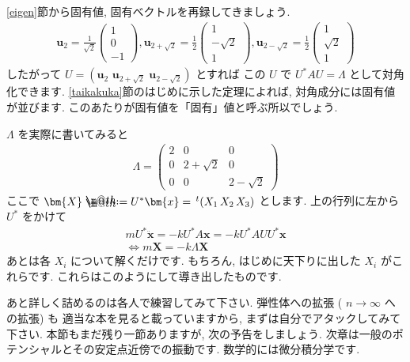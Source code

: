\documentclass[openany, a4paper, oneside]{jsbook}
\makeatletter
\newcommand*{\defeq}{\mathrel{\rlap{%
\raisebox{0.3ex}{$\m@th\cdot$}}%
\raisebox{-0.3ex}{$\m@th\cdot$}}%
=}
\theoremstyle{break}
\theoremstyle{breakdefn}
\makeatother
\begin{document}
\ref{eigen}節から固有値, 固有ベクトルを再録してきましょう.
    \begin{align}
        \bm{u}_{2}
        =
        \frac{1}{\sqrt{2}} \begin{pmatrix} 1 \\ 0 \\ -1 \end{pmatrix} ,
        \bm{u}_{2 + \sqrt{2}}
        =
        \frac{1}{2} \begin{pmatrix} 1 \\ -\sqrt{2} \\ 1 \end{pmatrix} ,
        \bm{u}_{2 - \sqrt{2}}
        =
        \frac{1}{2} \begin{pmatrix} 1 \\ \sqrt{2} \\ 1 \end{pmatrix}
    \end{align}
したがって $U = (\bm{u}_2 \,\, \bm{u}_{2+\sqrt{2}} \,\, \bm{u}_{2-\sqrt{2}})$ とすれば
この $U$ で $U^{*}AU=\Lambda$ として対角化できます. \ref{taikakuka}節のはじめに示した定理によれば,
対角成分には固有値が並びます. このあたりが固有値を「固有」値と呼ぶ所以でしょう.

 $\Lambda$ を実際に書いてみると
    \begin{align}
        \Lambda = \begin{pmatrix} 2 & 0 & 0 \\
                                  0 & 2 + \sqrt{2} & 0 \\
                                  0 & 0 & 2 - \sqrt{2}
                  \end{pmatrix}
    \end{align}
ここで $\bm{X}\defeq U^{*}\bm{x}=\, ^{t} (X_1 \, X_2 \, X_3)$ とします. 上の行列に左から $U^{*}$ をかけて
    \begin{gather}
        m U^{*}\ddot{\bm{x}} = -k U^{*}A\bm{x} = -k U^{*}AUU^{*}\bm{x} \\
        \Longleftrightarrow
        m\bm{X} = -k \Lambda \bm{X}
    \end{gather}
あとは各 $X_i$ について解くだけです. もちろん, はじめに天下りに出した $X_i$ がこれらです.
これらはこのようにして導き出したものです.

あと詳しく詰めるのは各人で練習してみて下さい. 弾性体への拡張 ( $n \rightarrow \infty$ への拡張) も
適当な本を見ると載っていますから, まずは自分でアタックしてみて下さい.
本節もまだ残り一節ありますが, 次の予告をしましょう.
次章は一般のポテンシャルとその安定点近傍での振動です. 数学的には微分積分学です.
\end{document}
